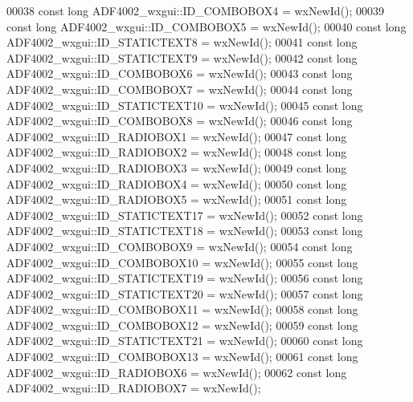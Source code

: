 \begin{DoxyCode}
00038 \textcolor{keyword}{const} \textcolor{keywordtype}{long} ADF4002_wxgui::ID_COMBOBOX4 = wxNewId();
00039 \textcolor{keyword}{const} \textcolor{keywordtype}{long} ADF4002_wxgui::ID_COMBOBOX5 = wxNewId();
00040 \textcolor{keyword}{const} \textcolor{keywordtype}{long} ADF4002_wxgui::ID_STATICTEXT8 = wxNewId();
00041 \textcolor{keyword}{const} \textcolor{keywordtype}{long} ADF4002_wxgui::ID_STATICTEXT9 = wxNewId();
00042 \textcolor{keyword}{const} \textcolor{keywordtype}{long} ADF4002_wxgui::ID_COMBOBOX6 = wxNewId();
00043 \textcolor{keyword}{const} \textcolor{keywordtype}{long} ADF4002_wxgui::ID_COMBOBOX7 = wxNewId();
00044 \textcolor{keyword}{const} \textcolor{keywordtype}{long} ADF4002_wxgui::ID_STATICTEXT10 = wxNewId();
00045 \textcolor{keyword}{const} \textcolor{keywordtype}{long} ADF4002_wxgui::ID_COMBOBOX8 = wxNewId();
00046 \textcolor{keyword}{const} \textcolor{keywordtype}{long} ADF4002_wxgui::ID_RADIOBOX1 = wxNewId();
00047 \textcolor{keyword}{const} \textcolor{keywordtype}{long} ADF4002_wxgui::ID_RADIOBOX2 = wxNewId();
00048 \textcolor{keyword}{const} \textcolor{keywordtype}{long} ADF4002_wxgui::ID_RADIOBOX3 = wxNewId();
00049 \textcolor{keyword}{const} \textcolor{keywordtype}{long} ADF4002_wxgui::ID_RADIOBOX4 = wxNewId();
00050 \textcolor{keyword}{const} \textcolor{keywordtype}{long} ADF4002_wxgui::ID_RADIOBOX5 = wxNewId();
00051 \textcolor{keyword}{const} \textcolor{keywordtype}{long} ADF4002_wxgui::ID_STATICTEXT17 = wxNewId();
00052 \textcolor{keyword}{const} \textcolor{keywordtype}{long} ADF4002_wxgui::ID_STATICTEXT18 = wxNewId();
00053 \textcolor{keyword}{const} \textcolor{keywordtype}{long} ADF4002_wxgui::ID_COMBOBOX9 = wxNewId();
00054 \textcolor{keyword}{const} \textcolor{keywordtype}{long} ADF4002_wxgui::ID_COMBOBOX10 = wxNewId();
00055 \textcolor{keyword}{const} \textcolor{keywordtype}{long} ADF4002_wxgui::ID_STATICTEXT19 = wxNewId();
00056 \textcolor{keyword}{const} \textcolor{keywordtype}{long} ADF4002_wxgui::ID_STATICTEXT20 = wxNewId();
00057 \textcolor{keyword}{const} \textcolor{keywordtype}{long} ADF4002_wxgui::ID_COMBOBOX11 = wxNewId();
00058 \textcolor{keyword}{const} \textcolor{keywordtype}{long} ADF4002_wxgui::ID_COMBOBOX12 = wxNewId();
00059 \textcolor{keyword}{const} \textcolor{keywordtype}{long} ADF4002_wxgui::ID_STATICTEXT21 = wxNewId();
00060 \textcolor{keyword}{const} \textcolor{keywordtype}{long} ADF4002_wxgui::ID_COMBOBOX13 = wxNewId();
00061 \textcolor{keyword}{const} \textcolor{keywordtype}{long} ADF4002_wxgui::ID_RADIOBOX6 = wxNewId();
00062 \textcolor{keyword}{const} \textcolor{keywordtype}{long} ADF4002_wxgui::ID_RADIOBOX7 = wxNewId();

\end{DoxyCode}
